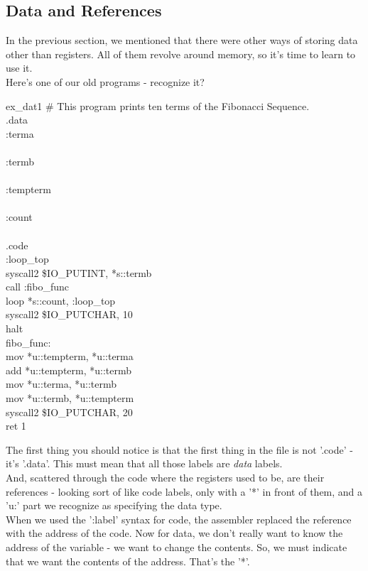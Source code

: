 \documentclass[a4paper,oneside,openany]{book}
\begin{document}
\subsection{Data and References}
In the previous section, we mentioned that there were other ways of storing data
other than registers. All of them revolve around memory, so it's time to learn
to use it.\\
Here's one of our old programs - recognize it?
\begin{codefile}{ex\_dat1}
\# This program prints ten terms of the Fibonacci Sequence.\\
.data\\
:terma\\
\\
:termb\\
\\
:tempterm\\
\\
:count\\
\\
.code\\
:loop\_top\\
\>	syscall2 \$IO\_PUTINT, *s::termb\\
\>	call :fibo\_func\\
\>	loop *s::count, :loop\_top\\
\>	syscall2 \$IO\_PUTCHAR, 10\\
\>	halt\\
\>fibo\_func:\\
\>	mov *u::tempterm, *u::terma\\
\>	add *u::tempterm, *u::termb\\
\>	mov *u::terma, *u::termb\\
\>	mov *u::termb, *u::tempterm\\
\>	syscall2 \$IO\_PUTCHAR, 20\\
\>	ret 1
\end{codefile}
The first thing you should notice is that the first thing in the file is not '.code' - it's '.data'.
This must mean that all those labels are \emph{data} labels.\\
And, scattered through the code where the registers used to be, are their references - looking sort of like code labels, only with a '*' in front of them, and a 'u:' part we recognize as specifying the data type.\\
When we used the ':label' syntax for code, the assembler replaced the reference with the address of the code. Now for data, we don't really want to know the address of the variable - we want to change the contents. So, we must indicate that we want the contents of the address. That's the '*'.\\
\end{document}
